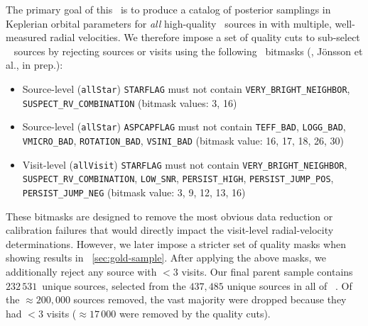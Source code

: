 \documentclass[modern]{aastex63}
\newcommand{\nsources}{\ensuremath{232\,531}}
\begin{document}
The primary goal of this \documentname\ is to produce a catalog of posterior
samplings in Keplerian orbital parameters for \emph{all} high-quality \apogee\
sources in  with multiple, well-measured radial velocities.
We therefore impose a set of quality cuts to sub-select \apogee\  sources
by rejecting sources or visits using the following \apogee\
bitmasks (\citealt{Holtzman:2018}, J\"onsson et al., in prep.):
\begin{itemize}
    \item Source-level (\texttt{allStar}) \texttt{STARFLAG} must not contain
    \texttt{VERY\_BRIGHT\_NEIGHBOR}, \texttt{SUSPECT\_RV\_COMBINATION} (bitmask
    values: 3, 16)
    \item Source-level (\texttt{allStar}) \texttt{ASPCAPFLAG} must not contain
    \texttt{TEFF\_BAD}, \texttt{LOGG\_BAD}, \texttt{VMICRO\_BAD},
    \texttt{ROTATION\_BAD}, \texttt{VSINI\_BAD} (bitmask value: 16, 17, 18, 26,
    30)
    \item Visit-level (\texttt{allVisit}) \texttt{STARFLAG} must not contain
    \texttt{VERY\_BRIGHT\_NEIGHBOR}, \texttt{SUSPECT\_RV\_COMBINATION},
    \texttt{LOW\_SNR}, \texttt{PERSIST\_HIGH}, \texttt{PERSIST\_JUMP\_POS},
    \texttt{PERSIST\_JUMP\_NEG} (bitmask value: 3, 9, 12, 13, 16)
\end{itemize}
These bitmasks are designed to remove the most obvious data reduction or
calibration failures that would directly impact the visit-level radial-velocity
determinations.
However, we later impose a stricter set of quality masks when showing results in
\sectionname~\ref{sec:gold-sample}.
After applying the above masks, we additionally reject any source with $<3$
visits.
Our final parent sample contains \nsources\ unique sources, selected from the
$437,485$ unique sources in all of \apogee\ .
Of the $\approx$$200,000$ sources removed, the vast majority were dropped
because they had $<3$ visits ($\approx$$17\,000$ were removed by the quality
cuts).
\end{document}
